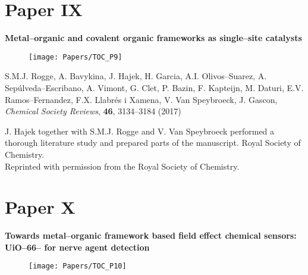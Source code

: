 \clearpage{\pagestyle{empty}\cleardoublepage}


\section*{Paper IX}

\vspace{0.1\textheight}
{
\large
\textbf{Metal--organic and covalent
organic frameworks as single--site catalysts} }
\begin{figure}[h!]
	\centering
	\texttt{[image: Papers/TOC\_P9]}
\end{figure}


\noindent
S.M.J. Rogge, A. Bavykina, J. Hajek, H. Garcia, A.I. Olivos--Suarez, A.
Sep\'ulveda--Escribano, A. Vimont, G. Clet, P. Bazin, F. Kapteijn, M. Daturi,
E.V.
Ramos--Fernandez, F.X. Llabr\'es i Xamena, V. Van Speybroeck, J. Gascon,
\textit{Chemical Society Reviews}, \textbf{46}, 3134--3184 (2017)
\npar

\vfill
\noindent J. Hajek together with S.M.J. Rogge and V. Van Speybroeck performed a
thorough literature study and prepared parts of the manuscript.
 \npar
\noindent {} Royal Society of Chemistry. \\
Reprinted with permission from the Royal Society of Chemistry.

\clearpage{\pagestyle{empty}\cleardoublepage}

 

\clearpage{\pagestyle{empty}\cleardoublepage}


\section*{Paper X}

\vspace{0.1\textheight}
{
\large
\textbf{Towards metal--organic
framework based field effect chemical sensors: UiO--66-- for nerve agent
detection} }
\begin{figure}[h!]
	\centering
	\texttt{[image: Papers/TOC\_P10]}
\end{figure}
 
